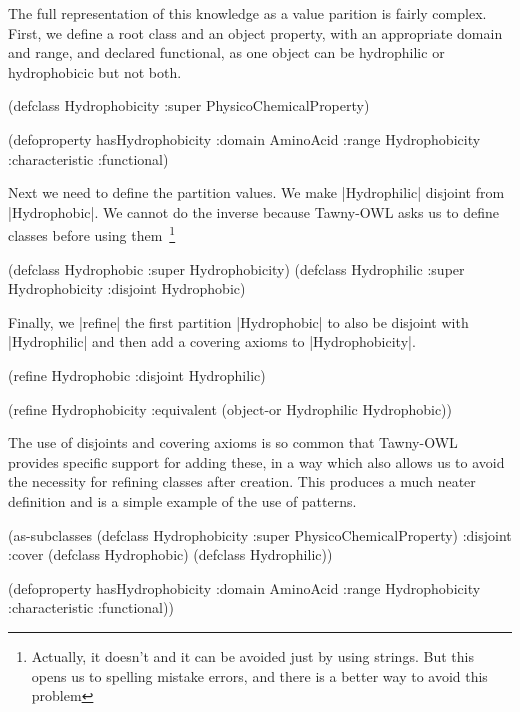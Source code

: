 The full representation of this knowledge as a value parition is fairly
complex. First, we define a root class and an object property, with
an appropriate domain and range, and declared functional, as one object can be
hydrophilic or hydrophobicic but not both.

\begin{tawnyexample}
(defclass Hydrophobicity :super PhysicoChemicalProperty)

(defoproperty hasHydrophobicity :domain AminoAcid
  :range Hydrophobicity :characteristic :functional)
\end{tawnyexample}

Next we need to define the partition values. We make |Hydrophilic| disjoint
from |Hydrophobic|. We cannot do the inverse because Tawny-OWL asks us to
define classes before using them~\footnote{Actually, it doesn't and it can be
  avoided just by using strings. But this opens us to spelling mistake errors,
  and there is a better way to avoid this problem}

\begin{tawnyexample}
(defclass Hydrophobic :super Hydrophobicity)
(defclass Hydrophilic :super Hydrophobicity :disjoint Hydrophobic)
\end{tawnyexample}

Finally, we |refine| the first partition |Hydrophobic| to also be disjoint
with |Hydrophilic| and then add a covering axioms to |Hydrophobicity|.

\begin{tawnyexample}
(refine Hydrophobic
  :disjoint Hydrophilic)

(refine Hydrophobicity
  :equivalent (object-or Hydrophilic Hydrophobic))
\end{tawnyexample}

The use of disjoints and covering axioms is so common that Tawny-OWL provides
specific support for adding these, in a way which also allows us to avoid the
necessity for refining classes after creation. This produces a much neater
definition and is a simple example of the use of patterns.

\begin{tawnyexample}
(as-subclasses
   (defclass Hydrophobicity :super PhysicoChemicalProperty)
   :disjoint :cover
   (defclass Hydrophobic)
   (defclass Hydrophilic))

(defoproperty hasHydrophobicity :domain AminoAcid
   :range Hydrophobicity :characteristic :functional))
\end{tawnyexample}

